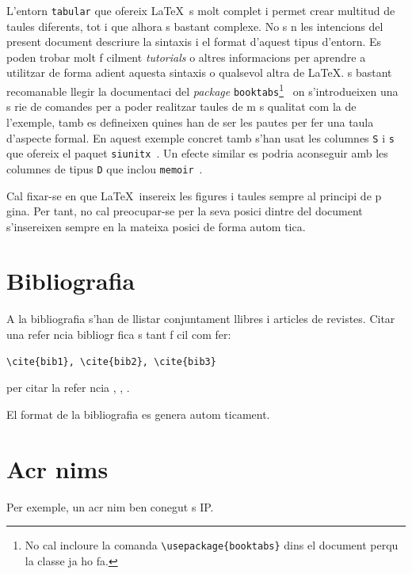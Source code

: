 L'entorn \texttt{tabular} que ofereix \LaTeX\   s molt complet i permet crear
multitud de taules diferents, tot i que alhora  s bastant complexe. No s n les
intencions del present document descriure la sintaxis i el format d'aquest
tipus d'entorn. Es poden trobar molt f cilment \emph{tutorials} o altres informacions
per aprendre a utilitzar de forma adient aquesta sintaxis o qualsevol altra de
\LaTeX.  s bastant recomanable llegir la documentaci  del \emph{package}
\texttt{booktabs}\footnote{No cal incloure la comanda  \texttt{\textbackslash usepackage\{booktabs\}} dins el document perqu  la classe ja ho fa.}~\cite{Fea05} on s'introdueixen una s rie de comandes per a poder realitzar
taules de m s qualitat com la de l'exemple, tamb  es defineixen quines han de
ser les pautes per fer una taula d'aspecte formal. En aquest exemple concret tamb  s'han usat les columnes \texttt{S} i \texttt{s} que ofereix el paquet \texttt{siunitx}~\cite{Wri12}. Un efecte similar es podria aconseguir amb les columnes de tipus \texttt{D} que inclou \texttt{memoir}~\cite[Cap. 11]{Wil10}.

Cal fixar-se en que \LaTeX\ insereix les figures i taules sempre al principi de p gina. Per tant, no cal preocupar-se per la seva posici 
dintre del document s'insereixen sempre en la mateixa posici  de forma autom tica.

\section{Bibliografia}

A la bibliografia s'han de llistar conjuntament llibres i articles de revistes.
Citar una refer ncia bibliogr fica  s tant f cil com fer:
\begin{verbatim}
\cite{bib1}, \cite{bib2}, \cite{bib3}
\end{verbatim}
per citar la refer ncia \cite{bib1}, \cite{bib2}, \cite{bib3}. 

El format de la bibliografia es genera autom ticament.

\section{Acr nims}

Per exemple, un acr nim ben conegut  s  \ac{IP}.
